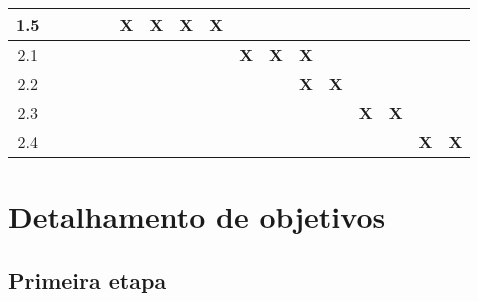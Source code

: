 \begin{table}[htb!]
\begin{tabular}{c|c|c|c|c|c|c|c|c|c|c|c|c|c|c|c|c|}
\multicolumn{1}{|c|}{1.5}             &                       &                       &                       &                       & {\bf X}               & {\bf X}               & {\bf X}               & {\bf X}               &                       &                       &                 &                 &                 &                 &                 &                 \\ \hline
\multicolumn{1}{|c|}{2.1}             &                       &                       &                       &                       &                       &                       &                       &                       & {\bf X}               & {\bf X}               & {\bf X}         &                 &                 &                 &                 &                 \\ \hline
\multicolumn{1}{|c|}{2.2}             &                       &                       &                       &                       &                       &                       &                       &                       &                       &                       & {\bf X}         & {\bf X}         &                 &                 &                 &                 \\ \hline
\multicolumn{1}{|c|}{2.3}             &                       &                       &                       &                       &                       &                       &                       &                       &                       &                       &                 &                 & {\bf X}         & {\bf X}         &                 &                 \\ \hline
\multicolumn{1}{|c|}{2.4}             &                       &                       &                       &                       &                       &                       &                       &                       &                       &                       &                 &                 &                 &                 & {\bf X}         & {\bf X}         \\ \hline
\end{tabular}
\end{table}

\section{\label{section:objectives}Detalhamento de objetivos}

\subsection{Primeira etapa}


